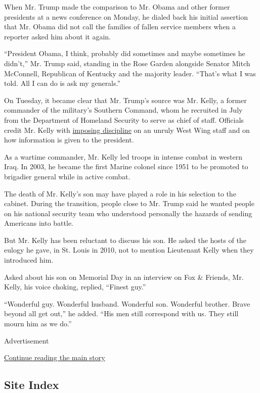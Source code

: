 When Mr. Trump made the comparison to Mr. Obama and other former
presidents at a news conference on Monday, he dialed back his initial
assertion that Mr. Obama did not call the families of fallen service
members when a reporter asked him about it again.

``President Obama, I think, probably did sometimes and maybe sometimes
he didn't,'' Mr. Trump said, standing in the Rose Garden alongside
Senator Mitch McConnell, Republican of Kentucky and the majority leader.
``That's what I was told. All I can do is ask my generals.''

On Tuesday, it became clear that Mr. Trump's source was Mr. Kelly, a
former commander of the military's Southern Command, whom he recruited
in July from the Department of Homeland Security to serve as chief of
staff. Officials credit Mr. Kelly with
\href{https://www.nytimes3xbfgragh.onion/2017/08/03/us/politics/john-kelly-chief-of-staff-trump.html}{imposing
discipline} on an unruly West Wing staff and on how information is given
to the president.

As a wartime commander, Mr. Kelly led troops in intense combat in
western Iraq. In 2003, he became the first Marine colonel since 1951 to
be promoted to brigadier general while in active combat.

The death of Mr. Kelly's son may have played a role in his selection to
the cabinet. During the transition, people close to Mr. Trump said he
wanted people on his national security team who understood personally
the hazards of sending Americans into battle.

But Mr. Kelly has been reluctant to discuss his son. He asked the hosts
of the eulogy he gave, in St. Louis in 2010, not to mention Lieutenant
Kelly when they introduced him.

Asked about his son on Memorial Day in an interview on Fox \& Friends,
Mr. Kelly, his voice choking, replied, ``Finest guy.''

``Wonderful guy. Wonderful husband. Wonderful son. Wonderful brother.
Brave beyond all get out,'' he added. ``His men still correspond with
us. They still mourn him as we do.''

Advertisement

\protect\hyperlink{after-bottom}{Continue reading the main story}

\hypertarget{site-index}{%
\subsection{Site Index}\label{site-index}}


